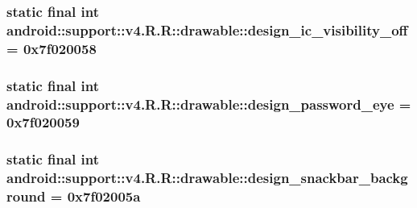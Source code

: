 \hypertarget{classandroid_1_1support_1_1v4_1_1_r_1_1drawable_b9d56c3c9df27fcd6fcc8c4a84e0de38}{
\subsubsection[{design\_\-ic\_\-visibility\_\-off}]{\setlength{\rightskip}{0pt plus 5cm}static final int android::support::v4.R.R::drawable::design\_\-ic\_\-visibility\_\-off = 0x7f020058}}
\label{classandroid_1_1support_1_1v4_1_1_r_1_1drawable_b9d56c3c9df27fcd6fcc8c4a84e0de38}


\hypertarget{classandroid_1_1support_1_1v4_1_1_r_1_1drawable_a4b3553538634c0fb56e2d42e2633e25}{
\subsubsection[{design\_\-password\_\-eye}]{\setlength{\rightskip}{0pt plus 5cm}static final int android::support::v4.R.R::drawable::design\_\-password\_\-eye = 0x7f020059}}
\label{classandroid_1_1support_1_1v4_1_1_r_1_1drawable_a4b3553538634c0fb56e2d42e2633e25}


\hypertarget{classandroid_1_1support_1_1v4_1_1_r_1_1drawable_dc67f80bb7cab80c4c9c0c96a1bab50c}{
\subsubsection[{design\_\-snackbar\_\-background}]{\setlength{\rightskip}{0pt plus 5cm}static final int android::support::v4.R.R::drawable::design\_\-snackbar\_\-background = 0x7f02005a}}
\label{classandroid_1_1support_1_1v4_1_1_r_1_1drawable_dc67f80bb7cab80c4c9c0c96a1bab50c}


